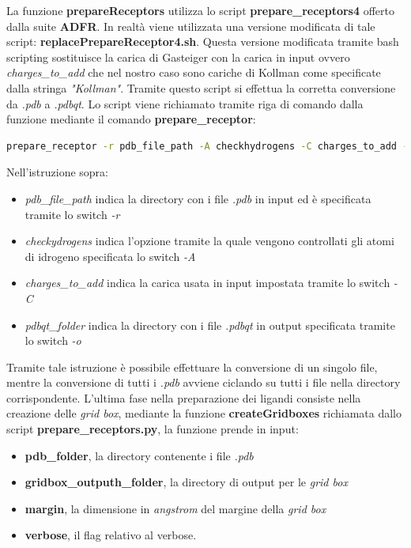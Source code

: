 La funzione \textbf{prepareReceptors} utilizza lo script \textbf{prepare\_receptors4} offerto dalla suite \textbf{ADFR}. In realtà viene utilizzata una versione modificata di tale script: \textbf{replacePrepareReceptor4.sh}. Questa versione modificata tramite bash scripting sostituisce la carica di Gasteiger con la carica in input ovvero \textit{charges\_to\_add} che nel nostro caso sono cariche di Kollman come specificate dalla stringa \textit{"Kollman"}. Tramite questo script si effettua la corretta conversione da \textit{.pdb} a \textit{.pdbqt}. Lo script viene richiamato tramite riga di comando dalla funzione mediante il comando \textbf{prepare\_receptor}:

\begin{lstlisting}[language=bash, label=lst:code27, caption={comando per convertire file da \textit{.pdb} a \textit{.pdbqt}}]
prepare_receptor -r pdb_file_path -A checkhydrogens -C charges_to_add -e -o pdbqt_folder
\end{lstlisting}

Nell'istruzione sopra:

\begin{itemize}
    \item \textit{pdb\_file\_path} indica la directory con i file \textit{.pdb} in input ed è specificata tramite lo switch \textit{-r}
    \item \textit{checkydrogens} indica l'opzione tramite la quale vengono controllati gli atomi di idrogeno specificata lo switch \textit{-A}    
    \item \textit{charges\_to\_add} indica la carica usata in input impostata tramite lo switch \textit{-C} 
    \item \textit{pdbqt\_folder} indica la directory con i file \textit{.pdbqt} in output specificata tramite lo switch \textit{-o}
\end{itemize}

Tramite tale istruzione è possibile effettuare la conversione di un singolo file, mentre la conversione di tutti i \textit{.pdb} avviene ciclando su tutti i file nella directory corrispondente.\newline
L'ultima fase nella preparazione dei ligandi consiste nella creazione delle \textit{grid box}, mediante la funzione \textbf{createGridboxes} richiamata dallo script \textbf{prepare\_receptors.py}, la funzione prende in input:

\begin{itemize}
    \item \textbf{pdb\_folder}, la directory contenente i file \textit{.pdb} 
    \item \textbf{gridbox\_outputh\_folder}, la directory di output per le \textit{grid box}
    \item \textbf{margin}, la dimensione in \textit{angstrom} del margine della \textit{grid box}
    \item \textbf{verbose}, il flag relativo al verbose.
\end{itemize}

